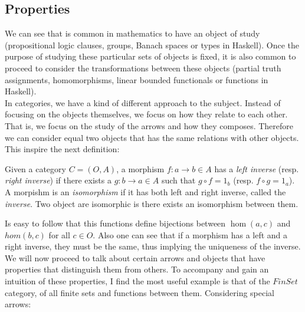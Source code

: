 \subsection{Properties}

We can see that is common in mathematics to have an object of study (propositional logic clauses, groups, Banach spaces or types in Haskell). Once the purpose of studying these particular sets of objects is fixed, it is also common to proceed to consider the transformations between these objects (partial truth assignments, homomorphisms, linear bounded functionals or  functions in Haskell).\\

In categories, we have a kind of different approach to the subject. Instead of focusing on the objects themselves, we focus on how they relate to each other. That is, we focus on the study of the arrows and how they composes. Therefore we can consider equal two objects that has the same relations with other objects. This inspire the next definition:

\begin{definition}
  Given a category $C=(O,A)$, a morphism $f: a \to b \in A$ has a \emph{left inverse} (resp. \emph{right inverse}) if there exists a $g: b \to a \in A$ such that $g \circ f = 1_b$ (resp. $f \circ g = 1_a$). A morpishm is an \emph{isomorphism} if it has both left and right inverse, called the \emph{inverse}. Two object are isomorphic is there exists an isomorphism between them.
\end{definition}


Is easy to follow that this functions define bijections between $\hom(a,c)$ and $hom(b,c)$ for all $c\in O$. Also one can see that if a morphism has a left and a right inverse, they must be the same, thus implying the uniqueness of the inverse.\\


We will now proceed to talk about certain arrows and objects that have properties that distinguish them from others. To accompany and gain an intuition of these properties, I find the most useful example is that of the $FinSet$ category, of all finite sets and functions between them.  Considering special arrows:\\

